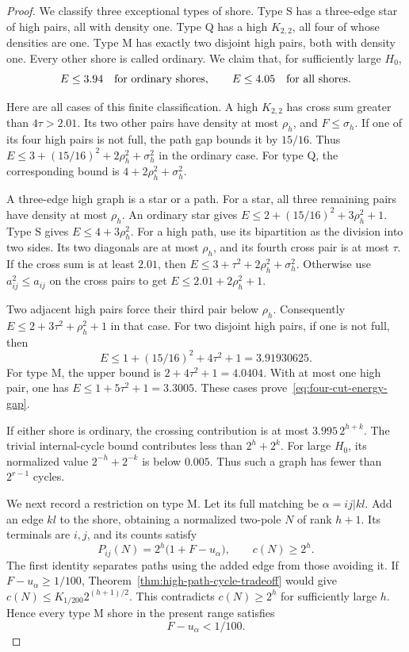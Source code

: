 \begin{proof}
We classify three exceptional types of shore.
Type S has a three-edge star of high pairs, all with density one.
Type Q has a high $K_{2,2}$, all four of whose densities are one.
Type M has exactly two disjoint high pairs, both with density one.
Every other shore is called ordinary.
We claim that, for sufficiently large $H_0$,
\begin{equation}\label{eq:four-cut-energy-gap}
 E\le3.94\quad\hbox{for ordinary shores},\qquad
 E\le4.05\quad\hbox{for all shores}.
\end{equation}

Here are all cases of this finite classification.
A high $K_{2,2}$ has cross sum greater than $4\tau>2.01$.
Its two other pairs have density at most $\rho_h$, and $F\le\sigma_h$.
If one of its four high pairs is not full, the path gap bounds it by $15/16$.
Thus $E\le3+(15/16)^2+2\rho_h^2+\sigma_h^2$ in the ordinary case.
For type Q, the corresponding bound is $4+2\rho_h^2+\sigma_h^2$.

A three-edge high graph is a star or a path.
For a star, all three remaining pairs have density at most $\rho_h$.
An ordinary star gives $E\le2+(15/16)^2+3\rho_h^2+1$.
Type S gives $E\le4+3\rho_h^2$.
For a high path, use its bipartition as the division into two sides.
Its two diagonals are at most $\rho_h$, and its fourth cross pair is at most $\tau$.
If the cross sum is at least $2.01$, then
$E\le3+\tau^2+2\rho_h^2+\sigma_h^2$.
Otherwise use $a_{ij}^2\le a_{ij}$ on the cross pairs to get
$E\le2.01+2\rho_h^2+1$.

Two adjacent high pairs force their third pair below $\rho_h$.
Consequently $E\le2+3\tau^2+\rho_h^2+1$ in that case.
For two disjoint high pairs, if one is not full, then
\[
 E\le1+(15/16)^2+4\tau^2+1=3.91930625.
\]
For type M, the upper bound is $2+4\tau^2+1=4.0404$.
With at most one high pair, one has $E\le1+5\tau^2+1=3.3005$.
These cases prove~\eqref{eq:four-cut-energy-gap}.

If either shore is ordinary, the crossing contribution is at most
$3.995\,2^{h+k}$.
The trivial internal-cycle bound contributes less than $2^h+2^k$.
For large $H_0$, its normalized value $2^{-h}+2^{-k}$ is below $0.005$.
Thus such a graph has fewer than $2^{r-1}$ cycles.

We next record a restriction on type M.
Let its full matching be $\alpha=ij|kl$.
Add an edge $kl$ to the shore, obtaining a normalized two-pole $N$ of rank $h+1$.
Its terminals are $i,j$, and its counts satisfy
\[
 P_{ij}(N)=2^h\bigl(1+F-u_\alpha\bigr),\qquad c(N)\ge2^h.
\]
The first identity separates paths using the added edge from those avoiding it.
If $F-u_\alpha\ge1/100$, Theorem~\ref{thm:high-path-cycle-tradeoff}
would give $c(N)\le K_{1/200}2^{(h+1)/2}$.
This contradicts $c(N)\ge2^h$ for sufficiently large $h$.
Hence every type M shore in the present range satisfies
\begin{equation}\label{eq:four-cut-M-concentration}
 F-u_\alpha<1/100.
\end{equation}


\end{proof}
